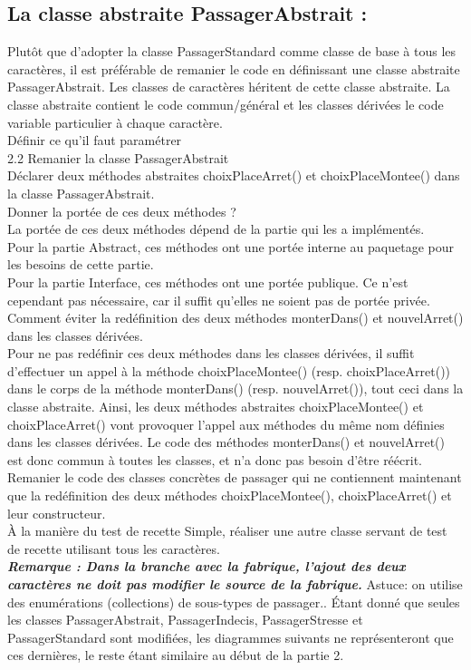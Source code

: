 \documentclass{article}
\begin{document}
\subsection{ La classe abstraite PassagerAbstrait : }
Plutôt que d’adopter la classe PassagerStandard comme classe de base à tous les
caractères, il est préférable de remanier le code en définissant une classe abstraite
PassagerAbstrait. Les classes de caractères héritent de cette classe abstraite.
La classe abstraite contient le code commun/général et les classes dérivées le code variable particulier à chaque caractère.\\
 Définir ce qu’il faut paramétrer\\
2.2 Remanier la classe PassagerAbstrait\\
Déclarer deux méthodes abstraites choixPlaceArret() et choixPlaceMontee() dans la
classe PassagerAbstrait.\\
Donner la portée de ces deux méthodes ?\\
La portée de ces deux méthodes dépend de la partie qui les a implémentés.\\
Pour la partie Abstract, ces méthodes ont une portée interne au paquetage pour les besoins de cette partie.\\
Pour la partie Interface, ces méthodes ont une portée publique. Ce n’est cependant pas
nécessaire, car il suffit qu’elles ne soient pas de portée privée.\\
\newline
Comment éviter la redéfinition des deux méthodes monterDans() et nouvelArret() dans les
classes dérivées.\\
Pour ne pas redéfinir ces deux méthodes dans les classes dérivées, il suffit d’effectuer un appel à la méthode choixPlaceMontee() (resp. choixPlaceArret()) dans le corps de la
méthode monterDans() (resp. nouvelArret()), tout ceci dans la classe abstraite.
\newline
Ainsi, les deux méthodes abstraites choixPlaceMontee() et choixPlaceArret() vont
provoquer l’appel aux méthodes du même nom définies dans les classes dérivées. Le code
des méthodes monterDans() et nouvelArret() est donc commun à toutes les classes, et n’a
donc pas besoin d’être réécrit.
\newline
\newline
Remanier le code des classes concrètes de passager qui ne contiennent maintenant que la
redéfinition des deux méthodes choixPlaceMontee(), choixPlaceArret() et leur
constructeur.\\
À la manière du test de recette Simple, réaliser une autre classe servant de test de recette utilisant tous les caractères.\\
\textbf{\textit{Remarque : Dans la branche avec la fabrique, l’ajout des deux caractères ne doit pas modifier le source de la fabrique.}}
Astuce: on utilise des enumérations (collections) de sous-types de passager..
\newline
Étant donné que seules les classes PassagerAbstrait, PassagerIndecis,
PassagerStresse et PassagerStandard sont modifiées, les diagrammes suivants ne
représenteront que ces dernières, le reste étant similaire au début de la partie 2.
\end{document}

